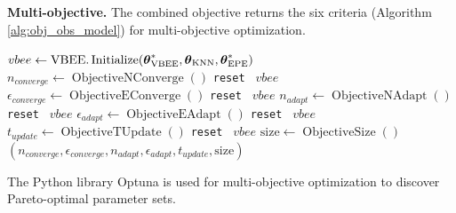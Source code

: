 \noindent\textbf{Multi-objective.} The combined objective returns the six criteria (Algorithm \ref{alg:obj_obs_model}) for multi-objective optimization.

\begin{singlespace}
\begin{algorithm}[H]
    \caption{Observability Model Objective Function}
    \label{alg:obj_obs_model}
    \begin{algorithmic}
        \Require{$\params{\vbee}^*, \params{\epe}^*$}
            \State $vbee \gets \text{VBEE}.\operatorname{Initialize}(\boldsymbol{\theta}_{\text{VBEE}}^*, \boldsymbol{\theta}_{\text{KNN}}, \boldsymbol{\theta}_{\text{EPE}}^*)$
            \State $n_{converge} \gets \operatorname{ObjectiveNConverge}()$
            \State \texttt{reset } $vbee$
            \State $\epsilon_{converge} \gets \operatorname{ObjectiveEConverge}()$
            \State \texttt{reset } $vbee$
            \State $n_{adapt} \gets \operatorname{ObjectiveNAdapt}()$
            \State \texttt{reset } $vbee$
            \State $\epsilon_{adapt} \gets \operatorname{ObjectiveEAdapt}()$
            \State \texttt{reset } $vbee$
            \State $t_{update} \gets \operatorname{ObjectiveTUpdate}()$
            \State \texttt{reset } $vbee$
            \State $\text{size} \gets \operatorname{ObjectiveSize}()$
            \State \Return $(n_{converge},\epsilon_{converge},n_{adapt},\epsilon_{adapt},t_{update},\text{size})$
        \EndFunction
    \end{algorithmic}
\end{algorithm}
\end{singlespace}

The Python library Optuna \cite{akibaOptunaNextgenerationHyperparameter2019} is used for multi-objective optimization to discover Pareto-optimal \cite{censorParetoOptimalityMultiobjective1977} parameter sets.



